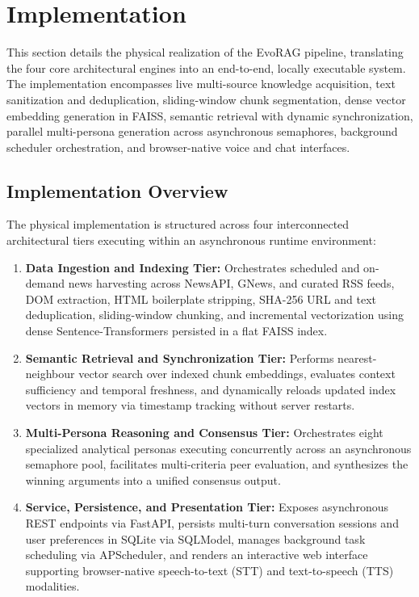 \section{Implementation}
\label{sec:implementation}

This section details the physical realization of the EvoRAG pipeline, translating the four core architectural engines into an end-to-end, locally executable system. The implementation encompasses live multi-source knowledge acquisition, text sanitization and deduplication, sliding-window chunk segmentation, dense vector embedding generation in FAISS, semantic retrieval with dynamic synchronization, parallel multi-persona generation across asynchronous semaphores, background scheduler orchestration, and browser-native voice and chat interfaces.

\subsection{Implementation Overview}
\label{subsec:impl_overview}
The physical implementation is structured across four interconnected architectural tiers executing within an asynchronous runtime environment:
\begin{enumerate}[label=(\roman*)]
    \item \textbf{Data Ingestion and Indexing Tier:} Orchestrates scheduled and on-demand news harvesting across NewsAPI, GNews, and curated RSS feeds, DOM extraction, HTML boilerplate stripping, SHA-256 URL and text deduplication, sliding-window chunking, and incremental vectorization using dense Sentence-Transformers persisted in a flat FAISS index.
    \item \textbf{Semantic Retrieval and Synchronization Tier:} Performs nearest-neighbour vector search over indexed chunk embeddings, evaluates context sufficiency and temporal freshness, and dynamically reloads updated index vectors in memory via timestamp tracking without server restarts.
    \item \textbf{Multi-Persona Reasoning and Consensus Tier:} Orchestrates eight specialized analytical personas executing concurrently across an asynchronous semaphore pool, facilitates multi-criteria peer evaluation, and synthesizes the winning arguments into a unified consensus output.
    \item \textbf{Service, Persistence, and Presentation Tier:} Exposes asynchronous REST endpoints via FastAPI, persists multi-turn conversation sessions and user preferences in SQLite via SQLModel, manages background task scheduling via APScheduler, and renders an interactive web interface supporting browser-native speech-to-text (STT) and text-to-speech (TTS) modalities.
\end{enumerate}

